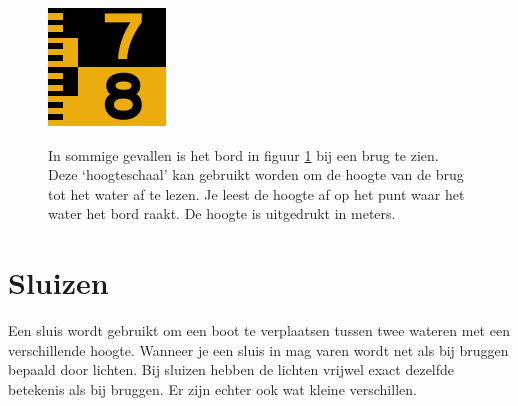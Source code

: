 \vspace{-0.75cm}
\begin{figure}[H]
	\centering
	\begin{minipage}[b]{0.18\textwidth}
		\includegraphics[width=\textwidth]{Hoofdstukken/Reglementen/pdf/hoogteschaal.pdf}
		\caption{}
		\label{pic:brug:schaal}
	\end{minipage}
	\hfill
	\begin{minipage}[t]{0.75\textwidth}
		\vspace{-3cm}
		In sommige gevallen is het bord in figuur \ref{pic:brug:schaal} bij een brug te zien. Deze `hoogteschaal' kan gebruikt worden om de hoogte van de brug tot het water af te lezen. Je leest de hoogte af op het punt waar het water het bord raakt. De hoogte is uitgedrukt in meters.
	\end{minipage}
\end{figure}

\section{Sluizen}
Een sluis wordt gebruikt om een boot te verplaatsen tussen twee wateren met een verschillende hoogte. Wanneer je een sluis in mag varen wordt net als bij bruggen bepaald door lichten.
Bij sluizen hebben de lichten vrijwel exact dezelfde betekenis als bij bruggen. Er zijn echter ook wat kleine verschillen. 

